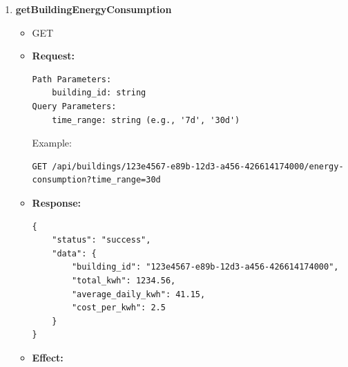 \documentclass[12pt, a4paper]{article}
\begin{document}
\begin{enumerate}
\begin{itemize}
        \item \textbf{Request:}
        \begin{verbatim}
Path Parameters:
    building_id: string
        \end{verbatim}
        Example:
        \begin{verbatim}
GET /api/buildings/123e4567-e89b-12d3-a456-426614174000
        \end{verbatim}
        \item \textbf{Response:}
        \begin{verbatim}
{
    "status": "success",
    "data": {
        "building_id": "123e4567-e89b-12d3-a456-426614174000",
        "building_name": "Corporate Headquarters",
        "timezone": "Africa/Johannesburg"
    }
}
        \end{verbatim}
        \item \textbf{Effect:}
        \begin{itemize}
            \item Returns all relevant details for a single building including.
            \item Only accessible if the authenticated user has access to it.
        \end{itemize}
    \end{itemize}
    \item \textbf{getBuildingEnergyConsumption}
    \begin{itemize}
        \item GET 
        \item \textbf{Request:}
        \begin{verbatim}
Path Parameters:
    building_id: string
Query Parameters:
    time_range: string (e.g., '7d', '30d')
        \end{verbatim}
        Example:
        \begin{verbatim}
GET /api/buildings/123e4567-e89b-12d3-a456-426614174000/energy-consumption?time_range=30d
        \end{verbatim}
        \item \textbf{Response:}
        \begin{verbatim}
{
    "status": "success",
    "data": {
        "building_id": "123e4567-e89b-12d3-a456-426614174000",
        "total_kwh": 1234.56,
        "average_daily_kwh": 41.15,
        "cost_per_kwh": 2.5
    }
}
        \end{verbatim}
        \item \textbf{Effect:}
        \begin{itemize}

\end{itemize}
\end{itemize}
\end{enumerate}
\end{document}
